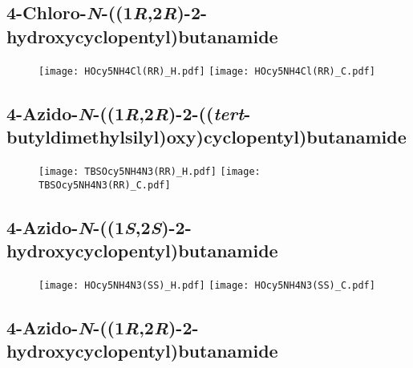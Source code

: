 \subsection{4\hyp{}Chloro\hyp{}\textit{N}\hyp{}((1\textit{R},2\textit{R})\hyp{}2\hyp{}hydroxycyclopentyl)butanamide }

\begin{figure}[H]
	\centering
		\texttt{[image: HOcy5NH4Cl(RR)\_H.pdf]}
		\texttt{[image: HOcy5NH4Cl(RR)\_C.pdf]}
\end{figure}

\subsection{4\hyp{}Azido\hyp{}\textit{N}\hyp{}((1\textit{R},2\textit{R})\hyp{}2\hyp{}((\textit{tert}\hyp{}butyldimethylsilyl)oxy)cyclopentyl)butanamide }

\begin{figure}[H]
	\centering
		\texttt{[image: TBSOcy5NH4N3(RR)\_H.pdf]}
		\texttt{[image: TBSOcy5NH4N3(RR)\_C.pdf]}
\end{figure}

\subsection{4\hyp{}Azido\hyp{}\textit{N}\hyp{}((1\textit{S},2\textit{S})\hyp{}2\hyp{}hydroxycyclopentyl)butanamide }

\begin{figure}[H]
	\centering
		\texttt{[image: HOcy5NH4N3(SS)\_H.pdf]}
		\texttt{[image: HOcy5NH4N3(SS)\_C.pdf]}
\end{figure}

\subsection{4\hyp{}Azido\hyp{}\textit{N}\hyp{}((1\textit{R},2\textit{R})\hyp{}2\hyp{}hydroxycyclopentyl)butanamide } 

